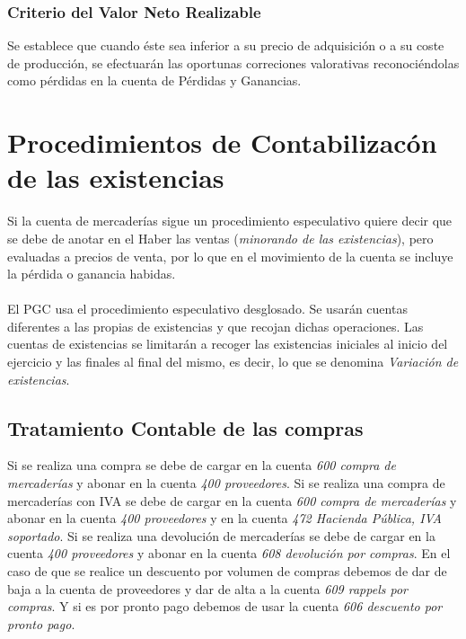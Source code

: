 \documentclass[a4paper,12pt]{article}
\begin{document}
\subsubsection*{Criterio del Valor Neto Realizable}

Se establece que cuando éste sea inferior a su precio de adquisición o a su coste de producción, se efectuarán las oportunas correciones valorativas reconociéndolas como pérdidas en la cuenta de Pérdidas y Ganancias.

\section{Procedimientos de Contabilizacón de las existencias}

Si la cuenta de mercaderías sigue un procedimiento especulativo quiere decir que se debe de anotar en el Haber las ventas (\textit{minorando de las existencias}), pero evaluadas a precios de venta, por lo que en el movimiento de la cuenta se incluye la pérdida o ganancia habidas.\\\\
El PGC usa el procedimiento especulativo desglosado. Se usarán cuentas diferentes a las propias de existencias y que recojan dichas operaciones. Las cuentas de existencias se limitarán a recoger las existencias iniciales al inicio del ejercicio y las finales al final del mismo, es decir, lo que se denomina \textit{Variación de existencias}.


\subsection{Tratamiento Contable de las compras}

Si se realiza una compra se debe de cargar en la cuenta \textit{600 compra de mercaderías} y abonar en la cuenta \textit{400 proveedores}. Si se realiza una compra de mercaderías con IVA se debe de cargar en la cuenta \textit{600 compra de mercaderías} y abonar en la cuenta \textit{400 proveedores} y en la cuenta \textit{472 Hacienda Pública, IVA soportado}. Si se realiza una devolución de mercaderías se debe de cargar en la cuenta \textit{400 proveedores} y abonar en la cuenta \textit{608 devolución por compras}. En el caso de que se realice un descuento por volumen de compras debemos de dar de baja a la cuenta de proveedores y dar de alta a la cuenta \textit{609 rappels por compras}. Y si es por pronto pago debemos de usar la cuenta \textit{606 descuento por pronto pago}.
\end{document}
